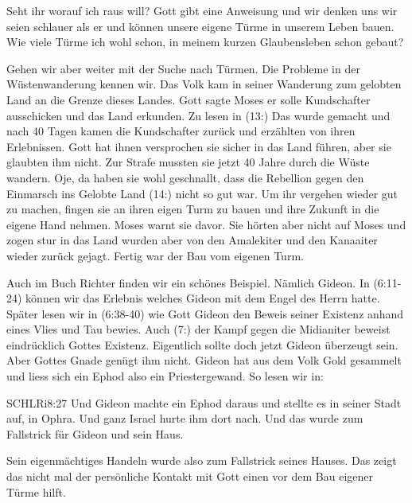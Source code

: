 \documentclass[14pt]{../../inc/mybib}
\newenvironment{block}[1][]{%
  \vspace{1.5em}%
  \noindent\textbf{#1}\par%
  \vspace{0.0em}%
}{%
  \vspace{1em}%
}
\begin{document}
\begin{block}
    Seht ihr worauf ich raus will? Gott gibt eine Anweisung und wir denken uns wir seien schlauer als er und können unsere eigene Türme in unserem Leben bauen. Wie viele Türme ich wohl schon, in meinem kurzen Glaubensleben schon gebaut?
\end{block}
\begin{block}
    Gehen wir aber weiter mit der Suche nach Türmen. Die Probleme in der Wüstenwanderung kennen wir. Das Volk kam in seiner Wanderung zum gelobten Land an die Grenze dieses Landes. Gott sagte Moses er solle Kundschafter ausschicken und das Land erkunden. Zu lesen in (13:) Das wurde gemacht und nach 40 Tagen kamen die Kundschafter zurück und erzählten von ihren Erlebnissen. Gott hat ihnen versprochen sie sicher in das Land führen, aber sie glaubten ihm nicht. Zur Strafe mussten sie jetzt 40 Jahre durch die Wüste wandern. Oje, da haben sie wohl geschnallt, dass die Rebellion gegen den Einmarsch ins Gelobte Land (14:) nicht so gut war. Um ihr vergehen wieder gut zu machen, fingen sie an ihren eigen Turm zu bauen und ihre Zukunft in die eigene Hand nehmen. Moses warnt sie davor. Sie hörten aber nicht auf Moses und zogen stur in das Land wurden aber von den Amalekiter und den Kanaaiter wieder zurück gejagt. Fertig war der Bau vom eigenen Turm.
\end{block}
\begin{block}
    Auch im Buch Richter finden wir ein schönes Beispiel. Nämlich Gideon. In (6:11-24) können wir das Erlebnis welches Gideon mit dem Engel des Herrn hatte. Später lesen wir in (6:38-40) wie Gott Gideon den Beweis seiner Existenz anhand eines Vlies und Tau bewies. Auch (7:) der Kampf gegen die Midianiter beweist eindrücklich Gottes Existenz. Eigentlich sollte doch jetzt Gideon überzeugt sein. Aber Gottes Gnade genügt ihm nicht. Gideon hat aus dem Volk Gold gesammelt und liess sich ein Ephod also ein Priestergewand. So lesen wir in:
    \begin{bibelbox}{SCHL}{Ri}{8:27}
        Und Gideon machte ein Ephod daraus und stellte es in seiner Stadt auf, in Ophra. Und ganz Israel hurte ihm dort nach. Und das wurde zum Fallstrick für Gideon und sein Haus.
    \end{bibelbox} 
    Sein eigenmächtiges Handeln wurde also zum Fallstrick seines Hauses. Das zeigt das nicht mal der persönliche Kontakt mit Gott einen vor dem Bau eigener Türme hilft.
\end{block}
\end{document}
